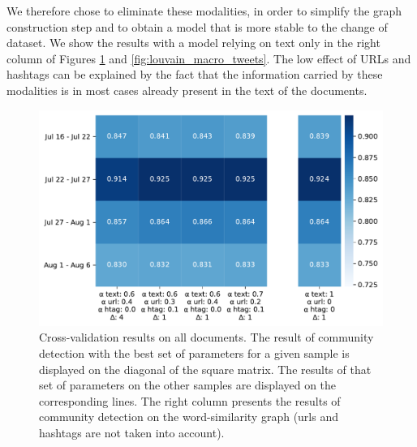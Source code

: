   We therefore chose to eliminate these modalities, in order to simplify the graph construction step and to obtain a model that is more stable to the change of dataset. We show the results with a model relying on text only in the right column of Figures \ref{fig:louvain_macro} and \ref{fig:louvain_macro_tweets}. The low effect of URLs and hashtags can be explained by the fact that the information carried by these modalities is in most cases already present in the text of the documents.
 \begin{figure}
 \begin{center}
      \includegraphics[height=.38\textheight]{figures/louvain_macro_tfidf.pdf}
    \caption[Cross-validation results on all documents]{Cross-validation results on all documents. The result of community detection with the best set of parameters for a given sample is displayed on the diagonal of the square matrix. The results of that set of parameters on the other samples are displayed on the corresponding lines. The right column presents the results of community detection on the word-similarity graph (urls and hashtags are not taken into account).}
    \label{fig:louvain_macro}
 \end{center}
\end{figure}
